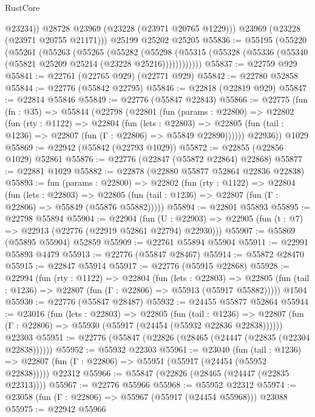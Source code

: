 \begin{lexlean}{RustCore}
\begin{coremodule}
            @23234))
        @28728
        @23969
        (@23228 (@23971 @20765 @1229)))
      @23969
      (@23228 (@23971 @20755 @21171)))
    @25199
    @25202
    @25205
@55836 := @55195
    (@55220
      (@55261
        (@55263
          (@55265
            (@55282
              (@55298
                (@55315 (@55328 (@55336 (@55340 (@55821 @25209 @25214 (@23228 @25216))))))))))))
@55837 := @22759 @929
@55841 := @22761 (@22765 @929) (@22771 @929)
@55842 := @22780 @52858
@55844 := @22776 (@55842 @22795)
@55846 := @22818 (@22819 @929)
@55847 := @22814 @55846
@55849 := @22776 (@55847 @22843)
@55866 := @22775
    (fun (fn : @35) =>
    @55844
      (@22798
        (@22801
          (fun (params : @22800) =>
          @22802
            (fun (rty : @1122) =>
            @22804
              (fun (lets : @22803) =>
              @22805 (fun (tail : @1236) => @22807 (fun (Γ : @22806) => @55849 @22890))))))
        @22936))
    @1029
@55869 := @22942 (@55842 (@22793 @1029))
@55872 := @22855 (@22856 @1029) @52861
@55876 := @22776 (@22847 (@55872 @22864) @22868)
@55877 := @22881 @1029
@55882 := @22878 (@22880 @55877 @52864 @22836 @22838)
@55893 := fun (params : @22800) =>
  @22802
    (fun (rty : @1122) =>
    @22804
      (fun (lets : @22803) =>
      @22805 (fun (tail : @1236) => @22807 (fun (Γ : @22806) => @55849 (@55876 @55882)))))
@55894 := @22801 @55893
@55895 := @22798 @55894
@55904 := @22904
    (fun (U : @22903) => @22905 (fun (t : @7) => @22913 (@22776 (@22919 @52861 @22794) @22930)))
@55907 := @55869 (@55895 @55904) @52859
@55909 := @22761 @55894 @55904
@55911 := @22991 @55893 @4479
@55913 := @22776 (@55847 @28467)
@55914 := @55872 @28470
@55915 := @22847 @55914
@55917 := @22776 (@55915 @22868)
@55928 := @22994
    (fun (rty : @1122) =>
    @22804
      (fun (lets : @22803) =>
      @22805 (fun (tail : @1236) => @22807 (fun (Γ : @22806) => @55913 (@55917 @55882)))))
    @1504
@55930 := @22776 (@55847 @28487)
@55932 := @24455 @55877 @52864
@55944 := @23016
    (fun (lets : @22803) =>
    @22805
      (fun (tail : @1236) =>
      @22807 (fun (Γ : @22806) => @55930 (@55917 (@24454 (@55932 @22836 @22838))))))
    @22303
@55951 := @22776 (@55847 (@22826 (@28465 (@24447 (@22835 (@22304 @22838))))))
@55952 := @55932 @22303
@55961 := @23040
    (fun (tail : @1236) => @22807 (fun (Γ : @22806) => @55951 (@55917 (@24454 (@55952 @22838)))))
    @22312
@55966 := @55847 (@22826 (@28465 (@24447 (@22835 @22313))))
@55967 := @22776 @55966
@55968 := @55952 @22312
@55974 := @23058 (fun (Γ : @22806) => @55967 (@55917 (@24454 @55968))) @23088
@55975 := @22942 @55966

\end{coremodule}
\end{lexlean}
